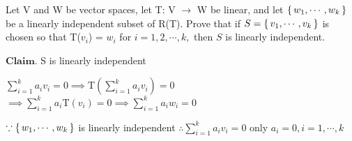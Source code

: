 Let V and W be vector spaces, let T: V $\rightarrow$ W be linear, and let $\left\{ \,w_1,\cdots,w_k \,\right\}$ be a linearly independent subset of R(T). Prove that if $S = \left\{ \,v_1,\cdots,v_k \,\right\}$ is chosen so that T($v_i$) = $w_i$ for $i=1,2,\cdots,k,$ then $S$ is linearly independent.

\begin{tcolorbox}
\begin{solution}
	$\textbf{Claim.}$ S is linearly independent
	
	$\sum^{k}_{i=1}a_iv_i=0 \implies \mathrm{T}(\sum^{k}_{i=1}a_iv_i) = 0$
	$\implies \sum^{k}_{i=1}a_i \mathrm{T}(v_i)=0 \implies \sum^{k}_{i=1}a_iw_i = 0$
	
	$\because \left\{ \,w_1,\cdots,w_k \,\right\}$ is linearly independent
	$\therefore \sum^{k}_{i=1}a_iv_i = 0$ only $a_i=0, i=1,\cdots,k$
\end{solution}

\end{tcolorbox}